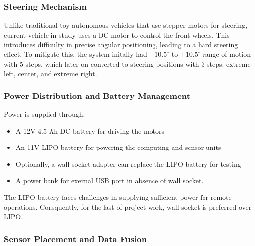 \documentclass[english,project]{buwthesis}
\begin{document}
\subsubsection{Steering Mechanism}
\sloppy
Unlike traditional toy autonomous vehicles that use stepper motors for steering, current vehicle in study uses a DC motor to control the front wheels. This introduces difficulty in precise angular positioning, leading to a hard steering effect. To mitigate this, the system initally had $-10.5^\circ$ to $+10.5^\circ$ range of motion with 5 steps, which later on converted to steering positions with 3 steps: extreme left, center, and extreme right.


\subsubsection{Power Distribution and Battery Management}

Power is supplied through:
\begin{itemize}
    \item A 12V 4.5 Ah DC battery for driving the motors
    \item An 11V LIPO battery for powering the computing and sensor units
    \item Optionally, a wall socket adapter can replace the LIPO battery for testing
    \item A power bank for exernal USB port in absence of wall socket.
\end{itemize}

The LIPO battery faces challenges in supplying sufficient power for remote operations. Consquently, for the last of project work, wall socket is preferred over LIPO.

\subsubsection{Sensor Placement and Data Fusion}
\end{document}
